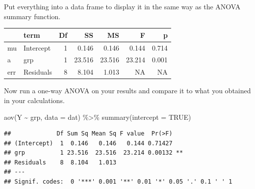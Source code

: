 \documentclass[
  oneside]{book}
\newenvironment{Shaded}{\begin{snugshade}}{\end{snugshade}}
\newcommand{\AttributeTok}[1]{\textcolor[rgb]{0.77,0.63,0.00}{#1}}
\newcommand{\ConstantTok}[1]{\textcolor[rgb]{0.00,0.00,0.00}{#1}}
\newcommand{\FunctionTok}[1]{\textcolor[rgb]{0.00,0.00,0.00}{#1}}
\newcommand{\NormalTok}[1]{#1}
\newcommand{\OtherTok}[1]{\textcolor[rgb]{0.56,0.35,0.01}{#1}}
\newcommand{\SpecialCharTok}[1]{\textcolor[rgb]{0.00,0.00,0.00}{#1}}
\newcommand{\StringTok}[1]{\textcolor[rgb]{0.31,0.60,0.02}{#1}}
\begin{document}
Put everything into a data frame to display it in the same way as the ANOVA summary function.

\begin{Shaded}
\end{Shaded}

\begin{tabular}{l|l|r|r|r|r|r}
\hline
  & term & Df & SS & MS & F & p\\
\hline
mu & Intercept & 1 & 0.146 & 0.146 & 0.144 & 0.714\\
\hline
a & grp & 1 & 23.516 & 23.516 & 23.214 & 0.001\\
\hline
err & Residuals & 8 & 8.104 & 1.013 & NA & NA\\
\hline
\end{tabular}

Now run a one-way ANOVA on your results and compare it to what you obtained in your calculations.

\begin{Shaded}
\begin{Highlighting}[]
\FunctionTok{aov}\NormalTok{(Y }\SpecialCharTok{\textasciitilde{}}\NormalTok{ grp, }\AttributeTok{data =}\NormalTok{ dat) }\SpecialCharTok{\%\textgreater{}\%} \FunctionTok{summary}\NormalTok{(}\AttributeTok{intercept =} \ConstantTok{TRUE}\NormalTok{)}
\end{Highlighting}
\end{Shaded}

\begin{verbatim}
##             Df Sum Sq Mean Sq F value  Pr(>F)   
## (Intercept)  1  0.146   0.146   0.144 0.71427   
## grp          1 23.516  23.516  23.214 0.00132 **
## Residuals    8  8.104   1.013                   
## ---
## Signif. codes:  0 '***' 0.001 '**' 0.01 '*' 0.05 '.' 0.1 ' ' 1
\end{verbatim}
\end{document}
